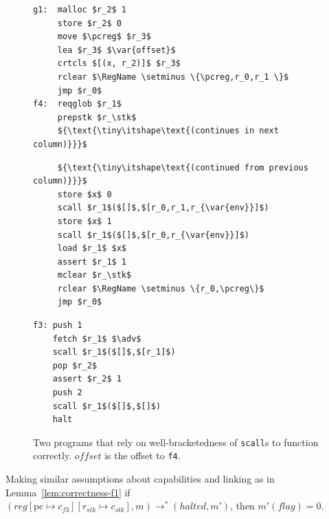 \documentclass{llncs}
\newcommand{\update}[2]{[#1 \mapsto #2]}
\newcommand{\var}[1]{\mathit{#1}}
\newcommand{\pcreg}{\mathrm{pc}}
\newcommand{\reg}{\var{reg}}
\newcommand{\adv}{\var{adv}}
\newcommand{\stk}{\var{stk}}
\newcommand{\flag}{\var{flag}}
\newcommand{\halted}{\mathit{halted}}
\newcommand{\plaindom}[1]{\mathrm{#1}}
\newcommand{\RegName}{\plaindom{RegName}}
\newcommand{\step}[1][]{\rightarrow_{#1}}
\begin{document}
\begin{figure}[t]
  \centering
  \begin{minipage}[t]{.37\linewidth}
  \begin{lstlisting}
g1:  malloc $r_2$ 1
     store $r_2$ 0
     move $\pcreg$ $r_3$
     lea $r_3$ $\var{offset}$
     crtcls $[(x, r_2)]$ $r_3$
     rclear $\RegName \setminus \{\pcreg,r_0,r_1 \}$
     jmp $r_0$
f4:  reqglob $r_1$
     prepstk $r_\stk$
     ${\text{\tiny\itshape\text{(continues in next column)}}}$
\end{lstlisting}
  \end{minipage}%
  \begin{minipage}[t]{.37\linewidth}
\begin{lstlisting}
     ${\text{\tiny\itshape\text{(continued from previous column)}}}$
     store $x$ 0
     scall $r_1$($[]$,$[r_0,r_1,r_{\var{env}}]$)
     store $x$ 1
     scall $r_1$($[]$,$[r_0,r_{\var{env}}]$)
     load $r_1$ $x$
     assert $r_1$ 1
     mclear $r_\stk$
     rclear $\RegName \setminus \{r_0,\pcreg\}$
     jmp $r_0$
\end{lstlisting}
  \end{minipage}%
  \begin{minipage}[t]{.25\linewidth}
  \begin{lstlisting}
f3: push 1
    fetch $r_1$ $\adv$
    scall $r_1$($[]$,$[r_1]$)
    pop $r_2$
    assert $r_2$ 1
    push 2
    scall $r_1$($[]$,$[]$)
    halt
\end{lstlisting}
  \end{minipage}
  \caption{ Two programs that rely on well-bracketedness of
    \texttt{scall}s to function correctly. $\var{offset}$ is the
    offset to \texttt{f4}.}
  \label{fig:prog-f3-and-g1}
\end{figure}

\begin{lemma}
  \label{lem:correctness-f3}
  Making similar assumptions about capabilities and linking as in
  Lemma~\ref{lem:correctness-f1}
  if $(\reg\update{\pcreg}{c_{f3}}\update{r_\stk}{c_\stk},m) \step^*
  (\halted,m')$, then $m'(\flag) = 0$.
\end{lemma}
\end{document}

